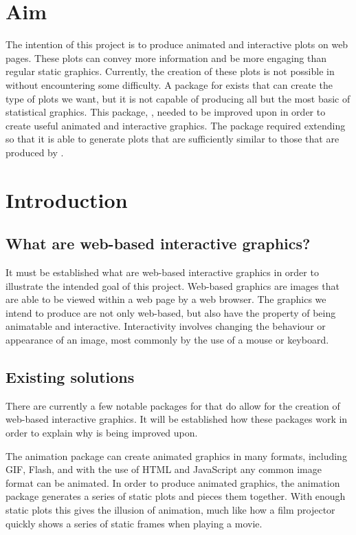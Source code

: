 \chapter{Aim}

The intention of this project is to produce animated and interactive plots on web pages.
These plots can convey more information and be more engaging than regular static graphics.
Currently, the creation of these plots is not possible in \R{} without encountering some difficulty.
A package for \R{} exists that can create the type of plots we want, but it is not capable of producing all but the most basic of statistical graphics.
This package, \gridSVG{}, needed to be improved upon in order to create useful animated and interactive graphics.
The \gridSVG{} package required extending so that it is able to generate plots that are sufficiently similar to those that are produced by \R{}.

\chapter{Introduction}

\section{What are web-based interactive graphics?}

It must be established what are web-based interactive graphics in order to illustrate the intended goal of this project.
Web-based graphics are images that are able to be viewed within a web page by a web browser.
The graphics we intend to produce are not only web-based, but also have the property of being animatable and interactive.
Interactivity involves changing the behaviour or appearance of an image, most commonly by the use of a mouse or keyboard.

\section{Existing solutions}

There are currently a few notable packages for \R{} that do allow for the creation of web-based interactive graphics.
It will be established how these packages work in order to explain why \gridSVG{} is being improved upon.

The \textsf{animation} package can create animated graphics in many formats, including GIF, Flash, and with the use of HTML and JavaScript any common image format can be animated.
In order to produce animated graphics, the \textsf{animation} package generates a series of static plots and pieces them together.
With enough static plots this gives the illusion of animation, much like how a film projector quickly shows a series of static frames when playing a movie.

